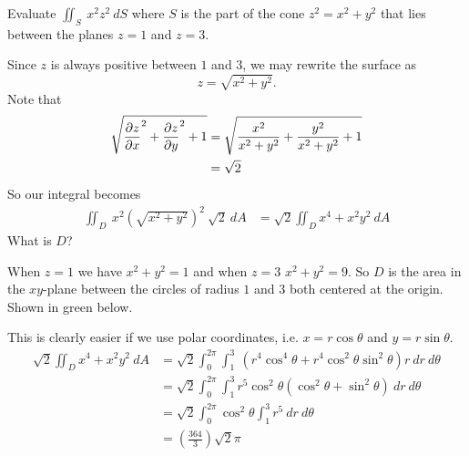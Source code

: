\documentclass[12pt]{exam}
\begin{document}
\newpage 

\begin{questions}

\question Evaluate \(\iint_S~x^2z^2~dS\) where \(S\) is the part of the cone 
    \(z^2=x^2+y^2\) that lies between the planes \(z=1\) and \(z=3\).
    \ifprintanswers
        \begin{solution}
            Since \(z\) is always positive between \(1\) and \(3\), we may rewrite the surface as 
            \[
                z=\sqrt{x^2+y^2}.
            \]
            Note that 
            \begin{align*}
                \sqrt{\dfrac{\partial z}{\partial x}^2+\dfrac{\partial z}{\partial y}^2+1} & = \sqrt{\frac{x^2}{x^2+y^2}+\frac{y^2}{x^2+y^2}+1}\\
                    &= \sqrt{2}
            \end{align*}
            So our integral becomes 
            \begin{align*}
                \iint_D~x^2\left(\sqrt{x^2+y^2}\right)^2~\sqrt{2}~dA & = \sqrt{2}\iint_{D}x^4+x^2y^2~dA
            \end{align*}
            What is \(D\)?

            When \(z=1\) we have \(x^2+y^2=1\) and when \(z=3\) \(x^2+y^2=9\). 
            So \(D\) is the area in the \(xy\)-plane between the circles of radius \(1\) and \(3\) both centered at the origin. Shown in green below.
            \begin{center}
            \end{center}
            This is clearly easier if we use polar coordinates, i.e. \(x=r\cos\theta\) and \(y=r\sin\theta\).
            \begin{align*}
            \sqrt{2}\iint_{D}x^4+x^2y^2~dA & = \sqrt{2}\int_0^{2\pi}\int_1^3~\left(r^4\cos^4\theta+r^4\cos^2\theta\sin^2\theta\right)r~dr~d\theta\\
            &= \sqrt{2}\int_0^{2\pi}\int_1^3 r^5\cos^2\theta\left(\cos^2\theta+\sin^2\theta\right)~dr~d\theta\\
            & = \sqrt{2}\int_{0}^{2\pi}\cos^2\theta \int_1^3 r^5~dr~d\theta\\
                & = \boxed{\left(\frac{364}{3}\right)\sqrt{2}\pi}
            \end{align*}
        \end{solution}
    \else
        \vfill
\fi


\end{questions}
\end{document}

